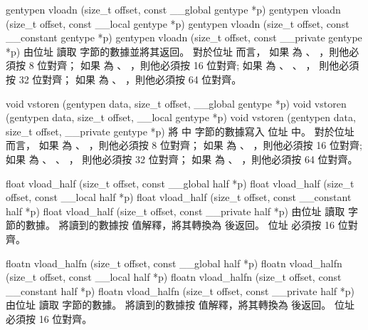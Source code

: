 gentypen vloadn (size_t offset,
	const __global gentype *p)
gentypen vloadn (size_t offset,
	const __local gentype *p)
gentypen vloadn (size_t offset,
	const __constant gentype *p)
gentypen vloadn (size_t offset,
	const __private gentype *p)
\stopbuffer
{}
由位址  讀取
  字節的數據並將其返回。
對於位址  而言，
如果  為 、 ，則他必須按 8 位對齊；
如果  為 、 ，則他必須按 16 位對齊;
如果  為 、 、 ，
則他必須按 32 位對齊；
如果  為 、 ，則他必須按 64 位對齊。
\stopbuffer

void vstoren (gentypen data,
	size_t offset,
	__global gentype *p)
void vstoren (gentypen data,
	size_t offset,
	__local gentype *p)
void vstoren (gentypen data,
	size_t offset,
	__private gentype *p)
\stopbuffer
{}
將  中
  字節的數據寫入
位址  中。
對於位址  而言，
如果  為 、 ，則他必須按 8 位對齊；
如果  為 、 ，則他必須按 16 位對齊;
如果  為 、 、 ，
則他必須按 32 位對齊；
如果  為 、 ，則他必須按 64 位對齊。
\stopbuffer

float vload_half (size_t offset,
		const __global half *p)
float vload_half (size_t offset,
		const __local half *p)
float vload_half (size_t offset,
		const __constant half *p)
float vload_half (size_t offset,
		const __private half *p)
\stopbuffer
{}
由位址  讀取
  字節的數據。
將讀到的數據按  值解釋，將其轉換為  後返回。
位址  必須按 16 位對齊。
\stopbuffer

floatn vload_halfn (size_t offset,
		const __global half *p)
floatn vload_halfn (size_t offset,
		const __local half *p)
floatn vload_halfn (size_t offset,
		const __constant half *p)
floatn vload_halfn (size_t offset,
		const __private half *p)
\stopbuffer
{}
由位址  讀取
  字節的數據。
將讀到的數據按  值解釋，將其轉換為  後返回。
位址  必須按 16 位對齊。
\stopbuffer

